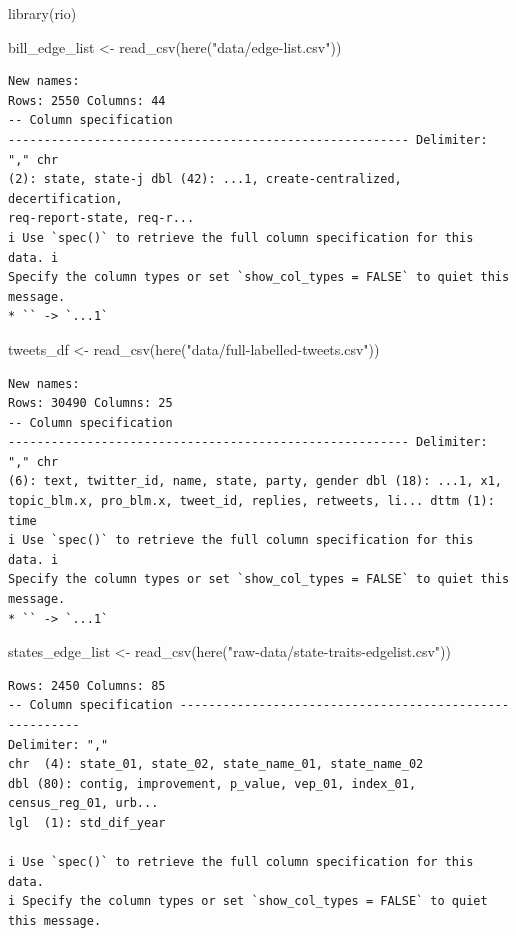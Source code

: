 \documentclass[
  letterpaper,
  DIV=11,
  numbers=noendperiod]{scrartcl}
\newenvironment{Shaded}{\begin{snugshade}}{\end{snugshade}}
\newcommand{\FunctionTok}[1]{\textcolor[rgb]{0.28,0.35,0.67}{#1}}
\newcommand{\NormalTok}[1]{\textcolor[rgb]{0.00,0.23,0.31}{#1}}
\newcommand{\OtherTok}[1]{\textcolor[rgb]{0.00,0.23,0.31}{#1}}
\newcommand{\StringTok}[1]{\textcolor[rgb]{0.13,0.47,0.30}{#1}}
\begin{document}
\begin{Shaded}
\begin{Highlighting}[]
\FunctionTok{library}\NormalTok{(rio)}

\NormalTok{bill\_edge\_list }\OtherTok{\textless{}{-}} \FunctionTok{read\_csv}\NormalTok{(}\FunctionTok{here}\NormalTok{(}\StringTok{"data/edge{-}list.csv"}\NormalTok{))}
\end{Highlighting}
\end{Shaded}

\begin{verbatim}
New names:
Rows: 2550 Columns: 44
-- Column specification
-------------------------------------------------------- Delimiter: "," chr
(2): state, state-j dbl (42): ...1, create-centralized, decertification,
req-report-state, req-r...
i Use `spec()` to retrieve the full column specification for this data. i
Specify the column types or set `show_col_types = FALSE` to quiet this message.
* `` -> `...1`
\end{verbatim}

\begin{Shaded}
\begin{Highlighting}[]
\NormalTok{tweets\_df }\OtherTok{\textless{}{-}} \FunctionTok{read\_csv}\NormalTok{(}\FunctionTok{here}\NormalTok{(}\StringTok{"data/full{-}labelled{-}tweets.csv"}\NormalTok{))}
\end{Highlighting}
\end{Shaded}

\begin{verbatim}
New names:
Rows: 30490 Columns: 25
-- Column specification
-------------------------------------------------------- Delimiter: "," chr
(6): text, twitter_id, name, state, party, gender dbl (18): ...1, x1,
topic_blm.x, pro_blm.x, tweet_id, replies, retweets, li... dttm (1): time
i Use `spec()` to retrieve the full column specification for this data. i
Specify the column types or set `show_col_types = FALSE` to quiet this message.
* `` -> `...1`
\end{verbatim}

\begin{Shaded}
\begin{Highlighting}[]
\NormalTok{states\_edge\_list }\OtherTok{\textless{}{-}} \FunctionTok{read\_csv}\NormalTok{(}\FunctionTok{here}\NormalTok{(}\StringTok{"raw{-}data/state{-}traits{-}edgelist.csv"}\NormalTok{))}
\end{Highlighting}
\end{Shaded}

\begin{verbatim}
Rows: 2450 Columns: 85
-- Column specification --------------------------------------------------------
Delimiter: ","
chr  (4): state_01, state_02, state_name_01, state_name_02
dbl (80): contig, improvement, p_value, vep_01, index_01, census_reg_01, urb...
lgl  (1): std_dif_year

i Use `spec()` to retrieve the full column specification for this data.
i Specify the column types or set `show_col_types = FALSE` to quiet this message.
\end{verbatim}
\end{document}
